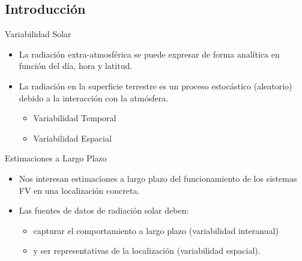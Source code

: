 \documentclass[xcolor={usenames,svgnames,dvipsnames}]{beamer}
\begin{document}
\subsection{Introducción}
\label{sec:orgbce8c1b}
\begin{frame}[label={sec:org1f638bb}]{Variabilidad Solar}
\begin{itemize}
\item La \alert{radiación extra-atmosférica} se puede expresar de forma \alert{analítica} en función del día, hora y latitud.
\item La \alert{radiación en la superficie terrestre} es un \alert{proceso estocástico} (aleatorio) debido a la interacción con la atmósfera.
\begin{itemize}
\item Variabilidad Temporal
\item Variabilidad Espacial
\end{itemize}
\end{itemize}
\end{frame}
\begin{frame}[label={sec:org26dfb4e}]{Estimaciones a Largo Plazo}
\begin{itemize}
\item Nos interesan \alert{estimaciones a largo plazo} del funcionamiento de los sistemas FV en una localización concreta.
\item Las fuentes de datos de radiación solar deben:
\begin{itemize}
\item \alert{capturar el comportamiento a largo plazo} (variabilidad interanual)
\item y ser \alert{representativas de la localización} (variabilidad espacial).
\end{itemize}
\end{itemize}
\end{frame}
\end{document}
